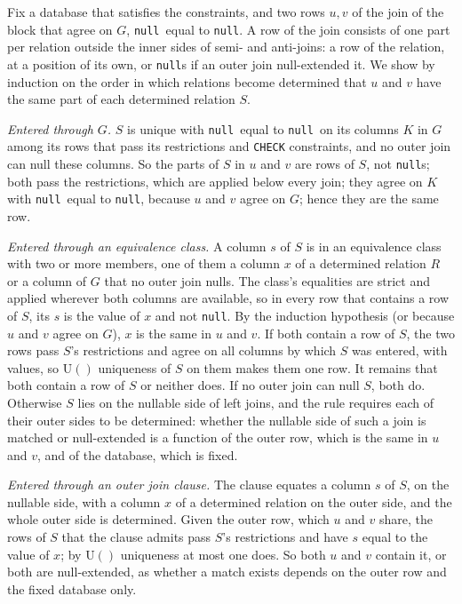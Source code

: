 \documentclass[conference]{IEEEtran}
\theoremstyle{definition}
\newcommand{\sql}[1]{\texttt{#1}}
\newcommand{\nul}{\texttt{null}}
\newcommand{\U}[1]{\mathrm{U}(#1)}
\begin{document}
Fix a database that satisfies the constraints, and two rows $u,v$ of the join of the block that
agree on $G$, \nul\ equal to \nul. A row of the join consists of one part per relation outside
the inner sides of semi- and anti-joins: a row of the relation, at a position of its own, or
\nul s if an outer join null-extended it. We show by induction on the order in which relations
become determined that $u$ and $v$ have the same part of each determined relation $S$.

\emph{Entered through $G$.} $S$ is unique with \nul\ equal to \nul\ on its columns $K$ in $G$
among its rows that pass its restrictions and \sql{CHECK} constraints, and no outer join can
null these columns. So the parts of $S$ in $u$ and $v$ are rows of $S$, not \nul s; both pass the
restrictions, which are applied below every join; they agree on $K$ with \nul\ equal to \nul,
because $u$ and $v$ agree on $G$; hence they are the same row.

\emph{Entered through an equivalence class.} A column $s$ of $S$ is in an equivalence class with
two or more members, one of them a column $x$ of a determined relation $R$ or a column of $G$ that
no outer join nulls. The class's equalities are strict and applied wherever both columns are
available, so in every row that contains a row of $S$, its $s$ is the value of $x$ and not \nul.
By the induction hypothesis (or because $u$ and $v$ agree on $G$), $x$ is the same in $u$ and $v$.
If both contain a row of $S$, the two rows pass $S$'s restrictions and agree on all columns by
which $S$ was entered, with values, so $\U{}$ uniqueness of $S$ on them makes them one row. It
remains that both contain a row of $S$ or neither does. If no outer join can null $S$, both do.
Otherwise $S$ lies on the nullable side of left joins, and the rule requires each of their outer
sides to be determined: whether the nullable side of such a join is matched or null-extended is
a function of the outer row, which is the same in $u$ and $v$, and of the database, which is
fixed.

\emph{Entered through an outer join clause.} The clause equates a column $s$ of $S$, on the
nullable side, with a column $x$ of a determined relation on the outer side, and the whole outer
side is determined. Given the outer row, which $u$ and $v$ share, the rows of $S$ that the
clause admits pass $S$'s restrictions and have $s$ equal to the value of $x$; by $\U{}$
uniqueness at most one does. So both $u$ and $v$ contain it, or both are null-extended, as
whether a match exists depends on the outer row and the fixed database only.
\end{document}
